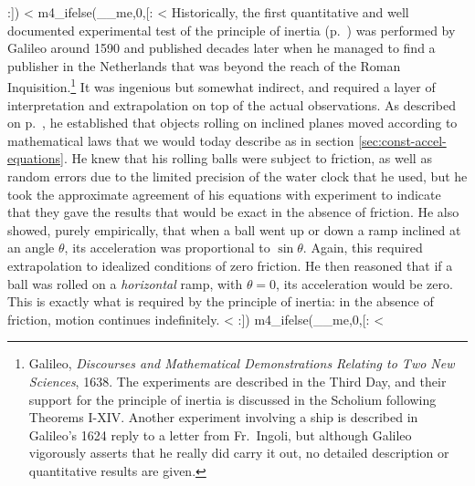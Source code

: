 :])
<%
m4_ifelse(__me,0,[:%
<%
Historically, the first quantitative and well 
documented experimental test
of the principle of inertia (p.~\pageref{principle-of-inertia}) was performed by Galileo
around 1590 and published decades later when he managed to find a publisher in
the Netherlands that was beyond the reach of
the Roman Inquisition.\footnote{Galileo, \emph{Discourses and Mathematical Demonstrations
Relating to Two New Sciences}, 1638. The experiments are described in the Third Day,
and their support for the principle of inertia is discussed
in the Scholium following 
Theorems I-XIV. %
Another experiment involving a ship is described
in Galileo's 1624 reply to a letter from Fr.~Ingoli, but although Galileo vigorously
asserts that he really did carry it out, no detailed description or quantitative results
are given.} It was ingenious but somewhat indirect, and required a layer of
interpretation and extrapolation on top of the actual observations. As described
on p.~\pageref{subsec:galileo-ramps-a-motivation}, he established that objects rolling
on inclined planes moved according to mathematical laws that we would today describe
as in section \ref{sec:const-accel-equations}. He knew that his rolling balls were subject
to friction, as well as random errors due to the limited precision of the water clock that
he used, but he took the approximate agreement of his equations with experiment to indicate
that they gave the results that would be exact in the absence of friction. He also showed,
purely empirically, that when a ball went up or down a ramp inclined at an angle $\theta$,
its acceleration was proportional to $\sin\theta$. Again, this required extrapolation to
idealized conditions of zero friction. He then reasoned that if a ball was rolled on a
\emph{horizontal} ramp, with $\theta=0$, its acceleration would be zero. This is exactly
what is required by the principle of inertia: in the absence of friction, motion continues
indefinitely.
<%
:])
m4_ifelse(__me,0,[:
<%

